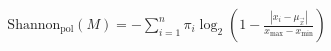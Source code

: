 \documentclass[preview]{standalone}
\begin{document}
\begin{align*}
\mathrm{Shannon}_{\text{pol}}(M) = -\sum_{i=1}^{n} \pi_i \log_2 \left( 1 - \frac{|x_i - \mu_\vec{x}|}{x_{\max} - x_{\min}} \right)
\end{align*}
\end{document}
